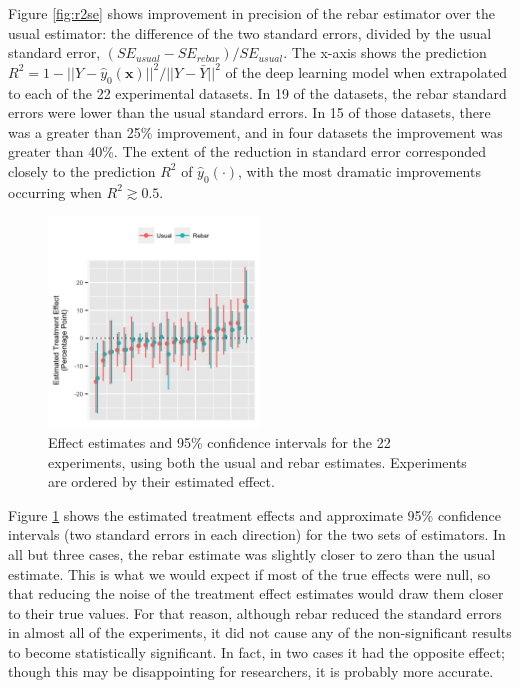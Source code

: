 \documentclass{edm_template}
\newcommand{\model}{\hat{y}_0(\cdot)}
\newcommand{\pred}{\hat{y}_0(\bm{x})}
\begin{document}
Figure \ref{fig:r2se} shows improvement in precision of the rebar estimator over the usual estimator: the difference of the two standard errors, divided by the usual standard error, $(SE_{usual}-SE_{rebar})/SE_{usual}$.
The x-axis shows the prediction $R^2=1-||Y-\pred||^2/||Y-\bar{Y}||^2$ of the deep learning model when extrapolated to each of the 22 experimental datasets. 
In 19 of the datasets, the rebar standard errors were lower than the usual standard errors. 
In 15 of those datasets, there was a greater than 25\% improvement, and in four datasets the improvement was greater than 40\%.
The extent of the reduction in standard error corresponded closely to the prediction $R^2$ of $\model$, with the most dramatic improvements occurring when $R^2\gtrsim 0.5$.

\begin{figure}
\centering
\includegraphics[width=0.5\textwidth]{estEff1.jpg}
\caption{Effect estimates and 95\% confidence intervals for the 22 experiments, using both the usual and rebar estimates. Experiments are ordered by their estimated effect.}
\label{fig:estEff1}
\end{figure}


Figure \ref{fig:estEff1} shows the estimated treatment effects and approximate 95\% confidence intervals (two standard errors in each direction) for the two sets of estimators. 
In all but three cases, the rebar estimate was slightly closer to zero than the usual estimate.
This is what we would expect if most of the true effects were null, so that reducing the noise of the treatment effect estimates would draw them closer to their true values. 
For that reason, although rebar reduced the standard errors in almost all of the experiments, it did not cause any of the non-significant results to become statistically significant. 
In fact, in two cases it had the opposite effect; though this may be disappointing for researchers, it is probably more accurate. 
\end{document}
